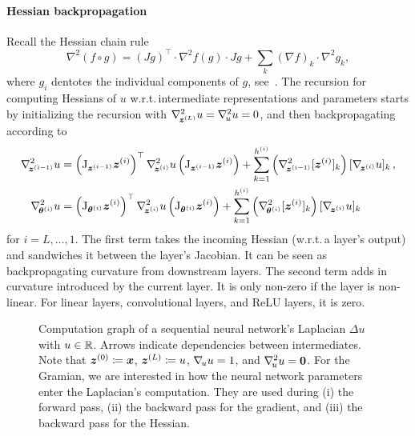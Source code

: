 \paragraph{Hessian backpropagation}
Recall the Hessian chain rule
\begin{equation*}
  \nabla^2 (f\circ g) = (J g)^\top\cdot \nabla^2 f(g) \cdot Jg + \sum_{k} (\nabla f)_k \cdot \nabla^2 g_k,
\end{equation*}
where $g_i$ dentotes the individual components of $g$, see~\cite{skorski2019chain}.
The recursion for computing Hessians of $u$
w.r.t.\,intermediate representations and parameters starts by initializing the
recursion with $\nabla_{\!{{\bm{z}}^{(L)}}}^{2}u = \nabla_{\!{u}}^{2} u = 0$, and then
backpropagating according to
\begin{align}\label{eq:hessian-backpropagation}
  \begin{split}
    \gradsquared{\vz^{(i-1)}}u
    &=
      \left( \jac_{\vz^{(i-1)}} \vz^{(i)} \right)^{\top}
      \gradsquared{\vz^{(i)}}u
      \left( \jac_{\vz^{(i-1)}} \vz^{(i)} \right)
      +
      \sum_{k=1}^{h^{(i)}}
      \left(
      \gradsquared{\vz^{(i-1)}} [\vz^{(i)}]_k
      \right)
      [\grad{\vz^{(i)}} u]_k\,,
    \\
    \gradsquared{\vtheta^{(i)}}u
    &=
      \left( \jac_{\vtheta^{(i)}} \vz^{(i)} \right)^{\top}
      \gradsquared{\vz^{(i)}}u
      \left( \jac_{\vtheta^{(i)}} \vz^{(i)} \right)
      +
      \sum_{k=1}^{h^{(i)}}
      \left(
      \gradsquared{\vtheta^{(i)}} [\vz^{(i)}]_k
      \right)
      [\grad{\vz^{(i)}} u]_k
  \end{split}
\end{align}
for $i = L, \dots, 1$.
The first term takes the incoming Hessian (w.r.t.\,a layer's output) and sandwiches it between the layer's Jacobian.
It can be seen as backpropagating curvature from downstream layers.
The second term adds in curvature introduced by the current layer.
It is only non-zero if the layer is non-linear.
For linear layers, convolutional layers, and ReLU layers, it is zero.

\begin{figure}[t]
  \centering
  \resizebox{\linewidth}{!}{%
    
  }
  \caption{Computation graph of a sequential neural network's Laplacian $\Delta u$ with $u \in {\mathbb{R}}$.
    Arrows indicate dependencies between intermediates.
    Note that ${\bm{z}}^{(0)} \coloneqq {\bm{x}}$, ${\bm{z}}^{(L)} \coloneqq u$, $\nabla_{\!{u}}u = 1$, and $\nabla_{\!{u}}^{2}u = {\bm{0}}$.
    For the Gramian, we are interested in how the neural network parameters enter the Laplacian's computation.
    They are used during (i) the forward pass, (ii) the backward pass for the gradient, and (iii) the backward pass for the Hessian.}\label{fig:hbp-dependencies}
\end{figure}

